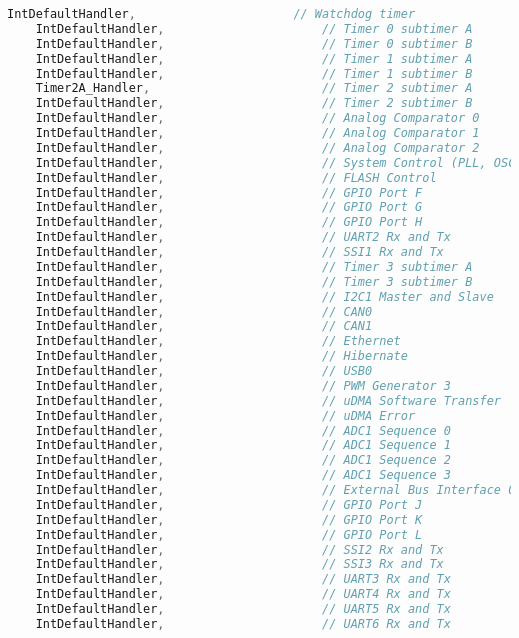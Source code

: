\documentclass{article}
\begin{document}
\begin{lstlisting}[language=c, caption={startup$\textunderscore$ccs.c}, captionpos=b]
    IntDefaultHandler,                      // Watchdog timer
    IntDefaultHandler,                      // Timer 0 subtimer A
    IntDefaultHandler,                      // Timer 0 subtimer B
    IntDefaultHandler,                      // Timer 1 subtimer A
    IntDefaultHandler,                      // Timer 1 subtimer B
    Timer2A_Handler,                        // Timer 2 subtimer A
    IntDefaultHandler,                      // Timer 2 subtimer B
    IntDefaultHandler,                      // Analog Comparator 0
    IntDefaultHandler,                      // Analog Comparator 1
    IntDefaultHandler,                      // Analog Comparator 2
    IntDefaultHandler,                      // System Control (PLL, OSC, BO)
    IntDefaultHandler,                      // FLASH Control
    IntDefaultHandler,                      // GPIO Port F
    IntDefaultHandler,                      // GPIO Port G
    IntDefaultHandler,                      // GPIO Port H
    IntDefaultHandler,                      // UART2 Rx and Tx
    IntDefaultHandler,                      // SSI1 Rx and Tx
    IntDefaultHandler,                      // Timer 3 subtimer A
    IntDefaultHandler,                      // Timer 3 subtimer B
    IntDefaultHandler,                      // I2C1 Master and Slave
    IntDefaultHandler,                      // CAN0
    IntDefaultHandler,                      // CAN1
    IntDefaultHandler,                      // Ethernet
    IntDefaultHandler,                      // Hibernate
    IntDefaultHandler,                      // USB0
    IntDefaultHandler,                      // PWM Generator 3
    IntDefaultHandler,                      // uDMA Software Transfer
    IntDefaultHandler,                      // uDMA Error
    IntDefaultHandler,                      // ADC1 Sequence 0
    IntDefaultHandler,                      // ADC1 Sequence 1
    IntDefaultHandler,                      // ADC1 Sequence 2
    IntDefaultHandler,                      // ADC1 Sequence 3
    IntDefaultHandler,                      // External Bus Interface 0
    IntDefaultHandler,                      // GPIO Port J
    IntDefaultHandler,                      // GPIO Port K
    IntDefaultHandler,                      // GPIO Port L
    IntDefaultHandler,                      // SSI2 Rx and Tx
    IntDefaultHandler,                      // SSI3 Rx and Tx
    IntDefaultHandler,                      // UART3 Rx and Tx
    IntDefaultHandler,                      // UART4 Rx and Tx
    IntDefaultHandler,                      // UART5 Rx and Tx
    IntDefaultHandler,                      // UART6 Rx and Tx

\end{lstlisting}
\end{document}
